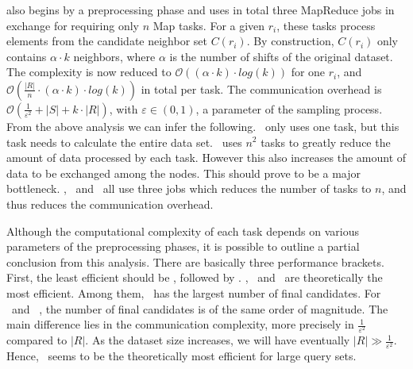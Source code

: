 {\bf \Z}\cite{Zhang:2012:EPK:2247596.2247602} also begins by a preprocessing phase and uses in total three MapReduce 
jobs in exchange for requiring only $n$ Map tasks. For a given $r_i$, these tasks 
process elements from the candidate neighbor set $C\left(r_i\right)$. By construction, $C\left(r_i\right)$ only 
contains  $\alpha \cdot k$ neighbors, where $\alpha$ is the number of shifts of the original dataset. The complexity is now reduced to $\mathcal{O}(\left(\alpha \cdot k\right) \cdot log\left(k\right))$ for one $r_i$, 
and $\mathcal{O}(\frac{\left|R\right|}{n} \cdot \left(\alpha \cdot k\right) \cdot log\left(k\right))$ in total 
per task. The communication overhead is 
$\mathcal{O}(\frac{1}{\varepsilon^2}+\left|S\right|+k \cdot \left|R\right|)$, with $\varepsilon \in (0,1)$, a parameter
of the sampling process. \\

From the above analysis we can infer the following. \HBK~only uses one task, but this task needs to calculate the 
entire data set. 
\HBNLJ~uses $n^2$ tasks to greatly reduce the amount of data processed by each task. However this also increases the 
amount of data to be exchanged among the nodes. This should prove to be a major bottleneck. 
\VO, \LSH~and \Z~all use three jobs which reduces the number of tasks to $n$, and thus reduces the communication 
overhead.

Although the computational complexity 
of each task depends on various parameters of the preprocessing phases, it is possible to outline a partial 
conclusion from this analysis. There are basically three performance brackets. First, the least efficient should be 
\HBK, followed by \HBNLJ. \VO, \LSH~and 
\Z~are theoretically the most efficient. Among them, \VO~has the largest number of final candidates. For \LSH~and
\Z~, the number of final candidates is of the same order of magnitude. The main difference lies in the communication
complexity, more precisely in $\frac{1}{\varepsilon^2}$ compared to $\left|R\right|$. As the dataset size increases,
we will have eventually  $\left|R\right| \gg \frac{1}{\varepsilon^2}$. Hence, \Z~seems to be the theoretically most
efficient for large query sets.






